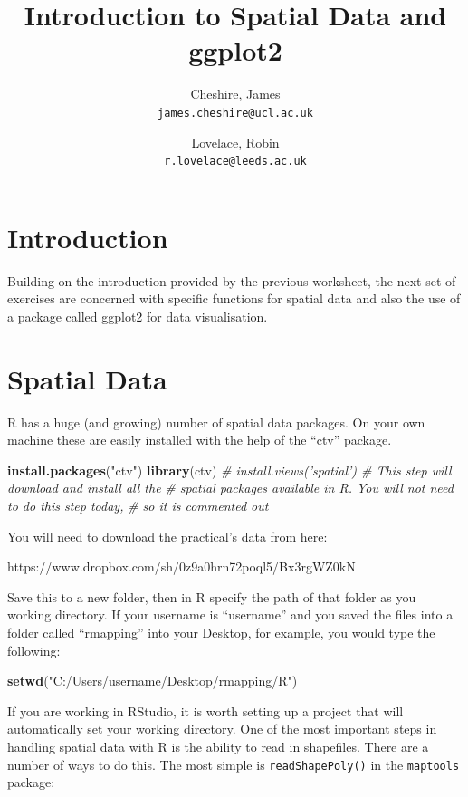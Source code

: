 \documentclass[]{article}
\author{
   Cheshire, James\\
  \texttt{james.cheshire@ucl.ac.uk}
  \and
  Lovelace, Robin\\
  \texttt{r.lovelace@leeds.ac.uk}
}
\title{Introduction to Spatial Data and ggplot2}
\newenvironment{Shaded}{}{}
\newcommand{\KeywordTok}[1]{\textcolor[rgb]{0.00,0.44,0.13}{\textbf{{#1}}}}
\newcommand{\StringTok}[1]{\textcolor[rgb]{0.25,0.44,0.63}{{#1}}}
\newcommand{\CommentTok}[1]{\textcolor[rgb]{0.38,0.63,0.69}{\textit{{#1}}}}
\newcommand{\NormalTok}[1]{{#1}}
\begin{document}
\maketitle

\section{Introduction}

Building on the introduction provided by the previous worksheet, the
next set of exercises are concerned with specific functions for spatial
data and also the use of a package called ggplot2 for data
visualisation.

\section{Spatial Data}

R has a huge (and growing) number of spatial data packages. On your own
machine these are easily installed with the help of the ``ctv'' package.

\begin{Shaded}
\begin{Highlighting}[]
\KeywordTok{install.packages}\NormalTok{(}\StringTok{"ctv"}\NormalTok{)}
\KeywordTok{library}\NormalTok{(ctv)}
\CommentTok{# install.views('spatial') # This step will download and install all the}
\CommentTok{# spatial packages available in R.  You will not need to do this step today,}
\CommentTok{# so it is commented out}
\end{Highlighting}
\end{Shaded}
You will need to download the practical's data from here:

https://www.dropbox.com/sh/0z9a0hrn72poql5/Bx3rgWZ0kN

Save this to a new folder, then in R specify the path of that folder as
you working directory. If your username is ``username'' and you saved
the files into a folder called ``rmapping'' into your Desktop, for
example, you would type the following:

\begin{Shaded}
\begin{Highlighting}[]
\KeywordTok{setwd}\NormalTok{(}\StringTok{"C:/Users/username/Desktop/rmapping/R"}\NormalTok{)}
\end{Highlighting}
\end{Shaded}
If you are working in RStudio, it is worth setting up a project that
will automatically set your working directory. One of the most important
steps in handling spatial data with R is the ability to read in
shapefiles. There are a number of ways to do this. The most simple is
\texttt{readShapePoly()} in the \texttt{maptools} package:
\end{document}
